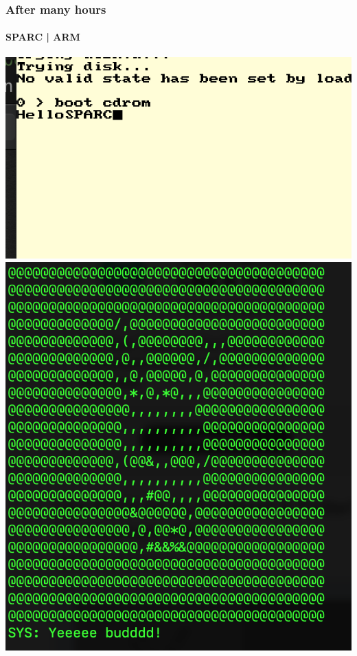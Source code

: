 \documentclass{beamer}
\begin{document}
\begin{frame}
    \frametitle{After many hours}
    \framesubtitle{SPARC | ARM}
    \includegraphics[scale=0.5]{sshot.png}
    \includegraphics[scale=0.4]{rshot.png}
    
\end{frame}
\end{document}
